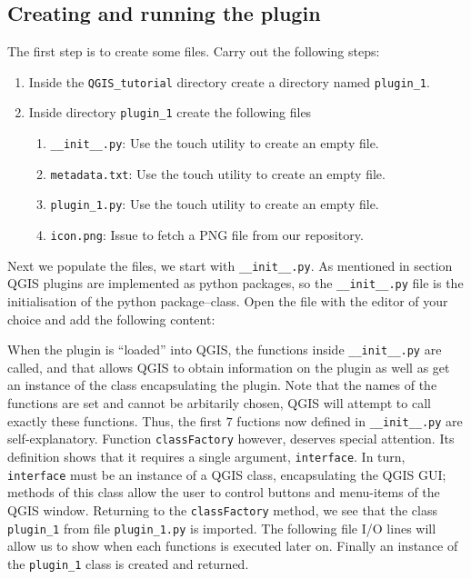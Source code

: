 \subsection{Creating and running the plugin}
\label{ssect:creating_plugin_1}
\par %
The first step is to create some files. Carry out the following steps:
\begin{enumerate}
  \item Inside the \lstinline{QGIS_tutorial} directory create a directory named \lstinline{plugin_1}.
  \item Inside directory \lstinline{plugin_1} create the following files
  \begin{enumerate}
    \item \lstinline{__init__.py}: Use the touch utility to create an empty file.
    \item \lstinline{metadata.txt}: Use the touch utility to create an empty file.
    \item \lstinline{plugin_1.py}: Use the touch utility to create an empty file.
    \item \lstinline{icon.png}: Issue \lstinline{} to fetch a PNG file from our repository.
  \end{enumerate}
\end{enumerate}
Next we populate the files, we start with \lstinline{__init__.py}. As mentioned in section \label{sect:introduction} QGIS plugins are implemented as python packages, so the \lstinline{__init__.py} file is the initialisation of the python package--class. Open the file with the editor of your choice and add the following content:

When the plugin is ``loaded'' into QGIS, the functions inside \lstinline{__init__.py} are called, and that allows QGIS to obtain information on the plugin as well as get an instance of the class encapsulating the plugin. Note that the names of the functions are set and cannot be arbitarily chosen, QGIS will attempt to call exactly these functions. Thus, the first $7$ fuctions now defined in \lstinline{__init__.py} are self-explanatory. Function \lstinline{classFactory} however, deserves special attention. Its definition shows that it requires a single argument, \lstinline{interface}. In turn, \lstinline{interface} must be an instance of a QGIS class, encapsulating the QGIS GUI; methods of this class allow the user to control buttons and menu-items of the QGIS window. Returning to the \lstinline{classFactory} method, we see that the class \lstinline{plugin_1} from file \lstinline{plugin_1.py} is imported. The following file I/O lines will allow us to show when each functions is executed later on. Finally an instance of the \lstinline{plugin_1} class is created and returned.
